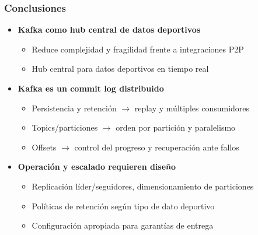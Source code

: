 \documentclass[aspectratio=169]{beamer}
\begin{document}
\begin{frame}\frametitle{Conclusiones}
\begin{itemize}
  \item \textbf{Kafka como hub central de datos deportivos}
  \begin{itemize}
    \item Reduce complejidad y fragilidad frente a integraciones P2P
    \item Hub central para datos deportivos en tiempo real
  \end{itemize}

  \vspace{0.5em}

  \item \textbf{Kafka es un commit log distribuido}
  \begin{itemize}
    \item Persistencia y retención $\rightarrow$ replay y múltiples consumidores
    \item Topics/particiones $\rightarrow$ orden por partición y paralelismo
    \item Offsets $\rightarrow$ control del progreso y recuperación ante fallos
  \end{itemize}

  \vspace{0.5em}

  \item \textbf{Operación y escalado requieren diseño}
  \begin{itemize}
    \item Replicación líder/seguidores, dimensionamiento de particiones
    \item Políticas de retención según tipo de dato deportivo
    \item Configuración apropiada para garantías de entrega
  \end{itemize}
\end{itemize}
\end{frame}
\end{document}
